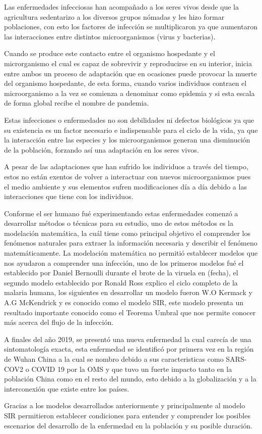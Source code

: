 
Las enfermedades infecciosas han acompañado a los seres vivos desde que la agricultura sedentarizo a los diversos grupos nómadas y les hizo formar poblaciones, con esto los factores de infección se multiplicaron ya que aumentaron las interacciones entre distintos microorganismos (virus y bacterias).

Cuando se produce este contacto entre el organismo hospedante y el microrganismo el cual es capaz de sobrevivir y reproducirse en su interior, inicia entre ambos un proceso de adaptación que en ocasiones puede provocar la muerte del organismo hospedante, de esta forma, cuando varios individuos contraen el microorganismo a la vez se comienza a denominar como epidemia y si esta escala de forma global recibe el nombre de pandemia.

Estas infecciones o enfermedades no son debilidades ni defectos biológicos ya que su existencia es un factor necesario e indispensable para el ciclo de la vida, ya que la interacción entre las especies y los microorganismos generan una disminución de la población, forzando así una adaptación en los seres vivos.

A pesar de las adaptaciones que han sufrido los individuos a través del tiempo, estos no están exentos de volver a interactuar con nuevos microorganismos pues el medio ambiente y sus elementos sufren modificaciones día a día debido a las interacciones que tiene con los individuos. %

Conforme el ser humano fué experimentando estas enfermedades comenzó a desarrollar métodos o técnicas para su estudio, uno de estos métodos es la modelación matemática, la cuál tiene como principal objetivo el comprender los fenómenos naturales para extraer la información necesaria y describir el fenómeno matemáticamente. La modelación matemática no permitió establecer modelos que nos ayudaron a comprender una infección, uno de los primeros modelos fué el establecido por Daniel Bernoulli durante el brote de la viruela en (fecha), el segundo modelo establecido por Ronald Ross explico el ciclo completo de la malaria humana, los siguientes en desarrollar un modelo fueron W.O Kermack y A.G McKendrick y es conocido como el modelo SIR, este modelo presenta un resultado importante conocido como el Teorema Umbral que nos permite conocer más acerca del flujo de la infección.

A finales del año 2019, se presentó una nueva enfermedad la cual carecía de una sintomatología exacta, esta enfermedad se identificó por primera vez en la región de Wuhan China a la cual se nombro debido a sus caracteristicas como SARS-COV2 o COVID 19 por la OMS y que tuvo un fuerte impacto tanto en la población China como en el resto del mundo, esto debido a la globalización y a la interconexión que existe entre los países.

Gracias a los modelos desarrollados anteriormente y principalmente al modelo SIR permitieron establecer condiciones para entender y comprender los posibles escenarios del desarrollo de la enfermedad en la población y su posible duración.
